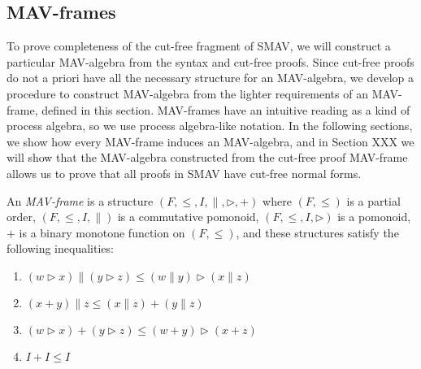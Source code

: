 \subsection{MAV-frames}

To prove completeness of the cut-free fragment of SMAV, we will
construct a particular MAV-algebra from the syntax and cut-free
proofs. Since cut-free proofs do not a priori have all the necessary
structure for an MAV-algebra, we develop a procedure to construct
MAV-algebra from the lighter requirements of an MAV-frame, defined in
this section. MAV-frames have an intuitive reading as a kind of
process algebra, so we use process algebra-like notation. In the
following sections, we show how every MAV-frame induces an
MAV-algebra, and in Section XXX we will show that the MAV-algebra
constructed from the cut-free proof MAV-frame allows us to prove that
all proofs in SMAV have cut-free normal forms.

\begin{definition}
  An \emph{MAV-frame} is a structure
  $(F, \leq, I, \parallel, \rhd, +)$ where $(F, \leq)$ is a partial
  order, $(F, \leq, I, \parallel)$ is a commutative pomonoid,
  $(F, \leq, I, \rhd)$ is a pomonoid, $+$ is a binary monotone
  function on $(F, \leq)$, and these structures satisfy the following
  inequalities:
  \begin{enumerate}
  \item $(w \rhd x) \parallel (y \rhd z) \leq (w \parallel y) \rhd (x \parallel z)$
  \item $(x + y) \parallel z \leq (x \parallel z) + (y \parallel z)$
  \item $(w \rhd x) + (y \rhd z) \leq (w + y) \rhd (x + z)$
  \item $I + I \leq I$
  \end{enumerate}
\end{definition}

\begin{remark}
\end{remark}

\begin{remark}
\end{remark}

